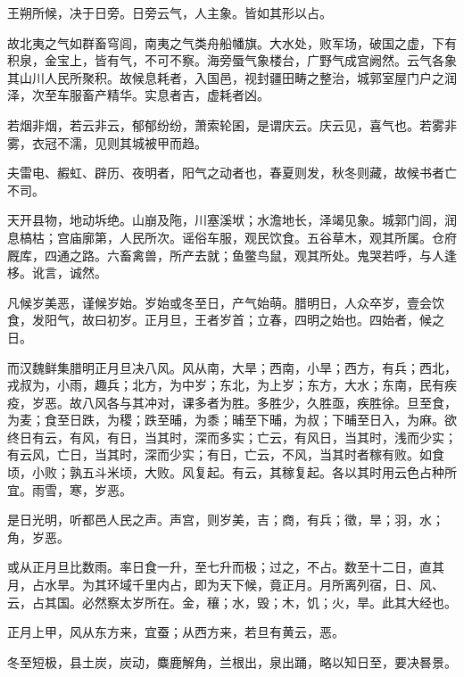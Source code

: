 \documentclass[12pt,UTF8]{ctexbook}
\begin{document}
王朔所候，决于日旁。日旁云气，人主象。皆如其形以占。



故北夷之气如群畜穹闾，南夷之气类舟船幡旗。大水处，败军场，破国之虚，下有积泉，金宝上，皆有气，不可不察。海旁蜃气象楼台，广野气成宫阙然。云气各象其山川人民所聚积。故候息耗者，入国邑，视封疆田畴之整治，城郭室屋门户之润泽，次至车服畜产精华。实息者吉，虚耗者凶。



若烟非烟，若云非云，郁郁纷纷，萧索轮囷，是谓庆云。庆云见，喜气也。若雾非雾，衣冠不濡，见则其城被甲而趋。



夫雷电、赮虹、辟历、夜明者，阳气之动者也，春夏则发，秋冬则藏，故候书者亡不司。



天开县物，地动坼绝。山崩及陁，川塞溪垘；水澹地长，泽竭见象。城郭门闾，润息槁枯；宫庙廓第，人民所次。谣俗车服，观民饮食。五谷草木，观其所属。仓府厩库，四通之路。六畜禽兽，所产去就；鱼鳖鸟鼠，观其所处。鬼哭若呼，与人逢栘。讹言，诚然。



凡候岁美恶，谨候岁始。岁始或冬至日，产气始萌。腊明日，人众卒岁，壹会饮食，发阳气，故曰初岁。正月旦，王者岁首；立春，四明之始也。四始者，候之日。



而汉魏鲜集腊明正月旦决八风。风从南，大旱；西南，小旱；西方，有兵；西北，戎叔为，小雨，趣兵；北方，为中岁；东北，为上岁；东方，大水；东南，民有疾疫，岁恶。故八风各与其冲对，课多者为胜。多胜少，久胜亟，疾胜徐。旦至食，为麦；食至日跌，为稷；跌至晡，为黍；晡至下晡，为叔；下晡至日入，为麻。欲终日有云，有风，有日，当其时，深而多实；亡云，有风日，当其时，浅而少实；有云风，亡日，当其时，深而少实；有日，亡云，不风，当其时者稼有败。如食顷，小败；孰五斗米顷，大败。风复起。有云，其稼复起。各以其时用云色占种所宜。雨雪，寒，岁恶。



是日光明，听都邑人民之声。声宫，则岁美，吉；商，有兵；徵，旱；羽，水；角，岁恶。



或从正月旦比数雨。率日食一升，至七升而极；过之，不占。数至十二日，直其月，占水旱。为其环域千里内占，即为天下候，竟正月。月所离列宿，日、风、云，占其国。必然察太岁所在。金，穰；水，毁；木，饥；火，旱。此其大经也。



正月上甲，风从东方来，宜蚕；从西方来，若旦有黄云，恶。



冬至短极，县土炭，炭动，麋鹿解角，兰根出，泉出踊，略以知日至，要决晷景。
\end{document}
